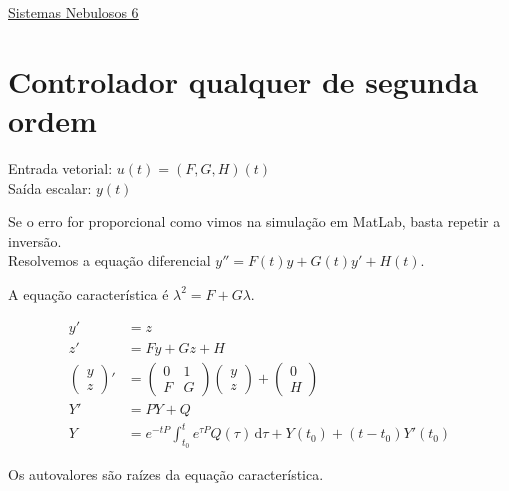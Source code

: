 \documentclass[12pt]{article}
\begin{document}
\Large

\begin{center}
\href{https://www.youtube.com/watch?v=2E0TYW42x1c}{\color{blue}\underline{Sistemas Nebulosos 6}}
\end{center}

\normalsize

\vspace{3mm}

\section{Controlador qualquer de segunda ordem}

\begin{flushleft}
Entrada vetorial: $u(t) = (F,G,H)(t)$ \\
Sa\'ida escalar: $y(t)$
\end{flushleft}

Se o erro for proporcional como vimos na simula\c{c}\~ao em MatLab, basta repetir a invers\~ao. \\

Resolvemos a equa\c{c}\~ao diferencial $y'' = F(t) y + G(t) y' + H(t)$.

A equa\c{c}\~ao caracter\'istica \'e $\lambda^2 = F + G\lambda$.

\begin{align}
 y' &= z \\
 z' &= Fy + Gz + H \\
 \begin{pmatrix} y \\ z \end{pmatrix}' &= \begin{pmatrix} 0 & 1 \\ F & G \end{pmatrix}\begin{pmatrix} y \\ z \end{pmatrix} + \begin{pmatrix} 0 \\ H \end{pmatrix} \\
 Y' &= P Y + Q \\
 Y &= e^{-tP} \int_{t_0}^t e^{\tau P} Q(\tau)\, \mathrm{d}\tau + Y(t_0) + (t-t_0) Y'(t_0)
\end{align}

Os autovalores s\~ao ra\'izes da equa\c{c}\~ao caracter\'istica.
\end{document}
